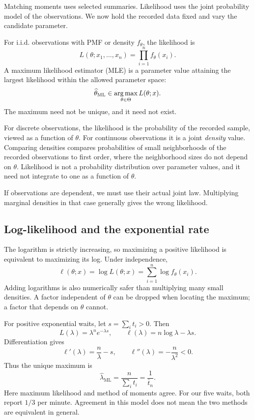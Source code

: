 Matching moments uses selected summaries. Likelihood uses the joint
probability model of the observations. We now hold the recorded data fixed
and vary the candidate parameter.

\begin{definition}
For i.i.d. observations with PMF or density \(f_\theta\), the likelihood is
\[
  L(\theta;x_1,\ldots,x_n)=\prod_{i=1}^n f_\theta(x_i).
\]
A maximum likelihood estimator (MLE) is a parameter value attaining the
largest likelihood within the allowed parameter space:
\[
  \widehat\theta_{\mathrm{ML}}\in\operatorname*{arg\,max}_{\theta\in\Theta}L(\theta;x).
\]
The maximum need not be unique, and it need not exist.
\end{definition}

For discrete observations, the likelihood is the probability of the recorded
sample, viewed as a function of \(\theta\). For continuous observations it
is a joint \emph{density} value. Comparing densities compares probabilities
of small neighborhoods of the recorded observations to first order, where
the neighborhood sizes do not depend on \(\theta\). Likelihood is not a
probability distribution over parameter values, and it need not integrate
to one as a function of \(\theta\).

If observations are dependent, we must use their actual joint law. Multiplying
marginal densities in that case generally gives the wrong likelihood.

\subsection{Log-likelihood and the exponential rate}

The logarithm is strictly increasing, so maximizing a positive likelihood
is equivalent to maximizing its log. Under independence,
\[
  \ell(\theta;x)=\log L(\theta;x)=\sum_{i=1}^n\log f_\theta(x_i).
\]
Adding logarithms is also numerically safer than multiplying many small
densities. A factor independent of \(\theta\) can be dropped when locating
the maximum; a factor that depends on \(\theta\) cannot.

For positive exponential waits, let \(s=\sum_i t_i>0\). Then
\[
  L(\lambda)=\lambda^n e^{-\lambda s},\qquad
  \ell(\lambda)=n\log\lambda-\lambda s.
\]
Differentiation gives
\[
  \ell'(\lambda)=\frac n\lambda-s,\qquad
  \ell''(\lambda)=-\frac n{\lambda^2}<0.
\]
Thus the unique maximum is
\begin{equation}
  \widehat\lambda_{\mathrm{ML}}=\frac n{\sum_i t_i}=\frac1{\bar t_n}.
  \label{eq:exponential-mle}
\end{equation}
Here maximum likelihood and method of moments agree. For our five waits,
both report \(1/3\) per minute. Agreement in this model does not mean the
two methods are equivalent in general.


